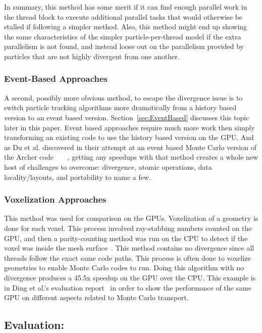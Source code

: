 In summary, this method has some merit if it can find enough parallel work in the thread block to execute additional parallel tasks that would otherwise be stalled if following a simpler method.
%
Also, this method might end up showing the same characteristics of the simpler particle-per-thread model if the extra parallelism is not found, and instead loose out on the parallelism provided by particles that are not highly divergent from one another. 

\subsubsection*{\textbf{Event-Based Approaches}}

A second, possibly more obvious method, to escape the divergence issue is to switch particle tracking algorithms more dramatically from a history based version to an event based version.
%
Section~\ref{sec:EventBased} discusses this topic later in this paper.
%
Event based approaches require much more work then simply transforming an existing code to use the history based version on the GPU.
%
And as Du et al. discovered in their attempt at an event based Monte Carlo version of the Archer code~\cite{xu2015archer}~\cite{du2013evaluation}~\cite{liu2015comparison}~\cite{su2013monte},  getting any speedups with that method creates a whole new host of challenges to overcome: divergence, atomic operations, data locality/layouts, and portability to name a few.

\subsubsection*{\textbf{Voxelization Approaches}}

This method was used for comparison on the GPUs.
%
Voxelization of a geometry is done for each voxel.
This process involved ray-stabbing numbers counted on the GPU, and then a parity-counting method was run on the CPU to detect if the voxel was inside the mesh surface~\cite{na2010deformable}.
%
This method contains no divergence since all threads follow the exact same code paths.
%
This process is often done to voxelize geometries to enable Monte Carlo codes to run.
%
Doing this algorithm with no divergence produces a 45.5x speedup on the GPU over the CPU.
%
This example is in Ding et al.'s evaluation report~\cite{ding2011evaluation} in order to show the performance of the same GPU on different aspects related to Monte Carlo transport.

\subsection*{ \textbf{Evaluation:}}

